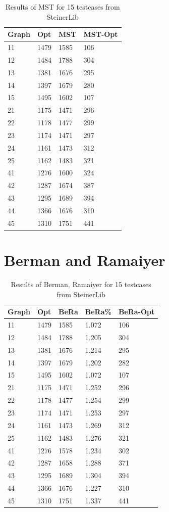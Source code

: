 \begin{table}[htbp]
 \caption{Results of MST for 15 testcases from SteinerLib \cite{Dui93}}\label{tab:MSTResults} 	
 \centering
 \begin{tabular}{l l l l}
\toprule
Graph & Opt & MST & MST-Opt \\
\midrule
11	& 1479	& 1585		& 106 \\
12	& 1484	& 1788		& 304 \\
13	& 1381	& 1676		& 295 \\
14	& 1397	& 1679		& 280 \\
15	& 1495	& 1602		& 107 \\
\midrule 
21	& 1175	& 1471		& 296 \\
22	& 1178	& 1477		& 299 \\
23	& 1174	& 1471		& 297 \\
24	& 1161	& 1473	 	& 312 \\
25	& 1162	& 1483		& 321 \\
\midrule
41	& 1276	& 1600		& 324 \\
42	& 1287	& 1674		& 387 \\
43	& 1295	& 1689		& 394 \\
44	& 1366	& 1676		& 310 \\
45	& 1310	& 1751		& 441 \\
\bottomrule
\end{tabular}
\end{table}


\section{Berman and Ramaiyer}

\begin{table}[htbp]
 \caption{Results of Berman, Ramaiyer for 15 testcases from SteinerLib \cite{Dui93}}\label{tab:BeRaResults} 	
 \centering
 \begin{tabular}{l l l l l}
\toprule
Graph & Opt & BeRa & BeRa\% & BeRa-Opt \\
\midrule
11	& 1479	& 1585	& 1.072	& 106 \\
12	& 1484	& 1788	& 1.205	& 304 \\
13	& 1381	& 1676	& 1.214	& 295 \\
14	& 1397	& 1679	& 1.202	& 282 \\
15	& 1495	& 1602	& 1.072	& 107 \\
\midrule 
21	& 1175	& 1471	& 1.252	& 296 \\
22	& 1178	& 1477	& 1.254	& 299 \\
23	& 1174	& 1471	& 1.253	& 297 \\
24	& 1161	& 1473	& 1.269 	& 312 \\
25	& 1162	& 1483	& 1.276	& 321 \\
\midrule
41	& 1276	& 1578	& 1.234	& 302 \\
42	& 1287	& 1658	& 1.288	& 371 \\
43	& 1295	& 1689	& 1.304	& 394 \\
44	& 1366	& 1676	& 1.227	& 310 \\
45	& 1310	& 1751	& 1.337	& 441 \\
\bottomrule
\end{tabular}
\end{table}

